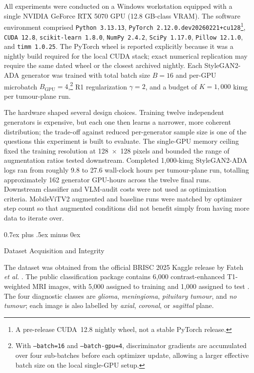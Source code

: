 \documentclass[conference,twoside]{IEEEtran}
\makeatletter
\newcommand{\bodyfont}{\rmfamily}
\def\subsection{\@startsection{subsection}{2}{\z@}{1.5ex plus 1.5ex minus 0.5ex}%
{0.7ex plus .5ex minus 0ex}{\normalfont\normalsize\bodyfont\bfseries\raggedright}}
\makeatother
\begin{document}
All experiments were conducted on a Windows workstation equipped with a single NVIDIA GeForce RTX 5070 GPU (12.8 GB-class VRAM). The software environment comprised \texttt{Python 3.13.13}, \texttt{PyTorch 2.12.0.dev20260221+cu128}\footnote{A pre-release CUDA~12.8 nightly wheel, not a stable PyTorch release.}, \texttt{CUDA 12.8}, \texttt{scikit-learn 1.8.0}, \texttt{NumPy 2.4.2}, \texttt{SciPy 1.17.0}, \texttt{Pillow 12.1.0}, and \texttt{timm 1.0.25}. The PyTorch wheel is reported explicitly because it was a nightly build required for the local CUDA stack; exact numerical replication may require the same dated wheel or the closest archived nightly. Each StyleGAN2-ADA generator was trained with total batch size $B=16$ and per-GPU microbatch $B_{\mathrm{GPU}}=4$,\footnote{With \texttt{--batch=16} and \texttt{--batch-gpu=4}, discriminator gradients are accumulated over four sub-batches before each optimizer update, allowing a larger effective batch size on the local single-GPU setup.} R1 regularization $\gamma = 2$, and a budget of $K=1{,}000$ kimg per tumour-plane run.

The hardware shaped several design choices. Training twelve independent generators is expensive, but each one then learns a narrower, more coherent distribution; the trade-off against reduced per-generator sample size is one of the questions this experiment is built to evaluate. The single-GPU memory ceiling fixed the training resolution at 128~$\times$~128 pixels and bounded the range of augmentation ratios tested downstream. Completed 1,000-kimg StyleGAN2-ADA logs ran from roughly 9.8 to 27.6 wall-clock hours per tumour-plane run, totalling approximately 162 generator GPU-hours across the twelve final runs. Downstream classifier and VLM-audit costs were not used as optimization criteria. MobileViTV2 augmented and baseline runs were matched by optimizer step count so that augmented conditions did not benefit simply from having more data to iterate over.

\subsection{Dataset Acquisition and Integrity}

The dataset was obtained from the official BRISC 2025 Kaggle release by Fateh \textit{et al.} \cite{fateh2025kaggle}. The public classification package contains 6,000 contrast-enhanced T1-weighted MRI images, with 5,000 assigned to training and 1,000 assigned to test \cite{fateh2026brisc}. The four diagnostic classes are \textit{glioma}, \textit{meningioma}, \textit{pituitary tumour}, and \textit{no tumour}; each image is also labelled by \textit{axial}, \textit{coronal}, or \textit{sagittal} plane.
\end{document}
